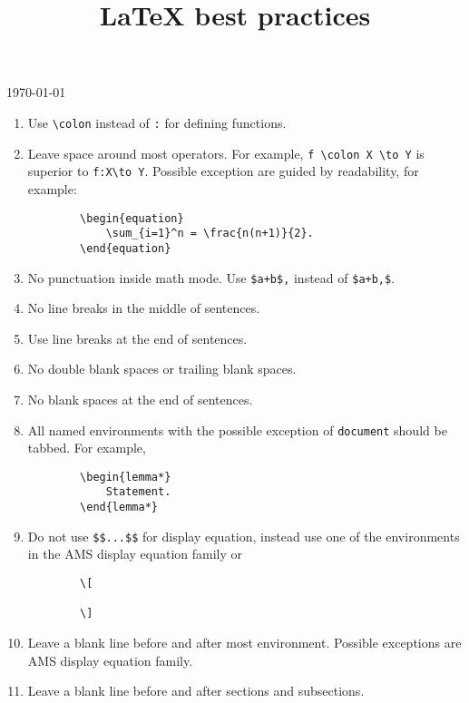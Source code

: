\documentclass{amsproc}
\title{{\LaTeX} best practices}
\begin{document}
	\noindent\today
	\maketitle

	\begin{enumerate}[1)]
		\item Use \verb|\colon| instead of \verb|:| for defining functions.

		\item Leave space around most operators.
		For example, \verb|f \colon X \to Y| is superior to \verb|f:X\to Y|.
		Possible exception are guided by readability, for example:
		\begin{verbatim}
		\begin{equation}
		    \sum_{i=1}^n = \frac{n(n+1)}{2}.
		\end{equation}
		\end{verbatim}

		\item No punctuation inside math mode.
		Use \verb|$a+b$,| instead of \verb|$a+b,$|.

		\item No line breaks in the middle of sentences.

		\item Use line breaks at the end of sentences.

		\item No double blank spaces or trailing blank spaces.

		\item No blank spaces at the end of sentences.

		\item All named environments with the possible exception of \verb|document| should be tabbed.
		For example,
		\begin{verbatim}
		\begin{lemma*}
		    Statement.
		\end{lemma*}
		\end{verbatim}

		\item Do not use \verb|$$...$$| for display equation, instead use one of the environments in the AMS display equation family or
		\begin{verbatim}
		\[

		\]
		\end{verbatim}

		\item Leave a blank line before and after most environment.
		Possible exceptions are AMS display equation family.

		\item Leave a blank line before and after sections and subsections.
	\end{enumerate}
\end{document}
